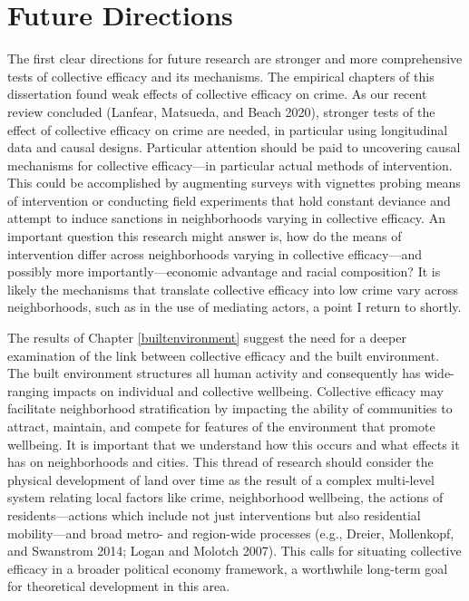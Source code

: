 \documentclass [11pt, proquest] {uwthesis}[2015/03/03]
\begin{document}
\hypertarget{future-directions}{%
\section{Future Directions}\label{future-directions}}

The first clear directions for future research are stronger and more comprehensive tests of collective efficacy and its mechanisms. The empirical chapters of this dissertation found weak effects of collective efficacy on crime. As our recent review concluded (Lanfear, Matsueda, and Beach 2020), stronger tests of the effect of collective efficacy on crime are needed, in particular using longitudinal data and causal designs. Particular attention should be paid to uncovering causal mechanisms for collective efficacy---in particular actual methods of intervention. This could be accomplished by augmenting surveys with vignettes probing means of intervention or conducting field experiments that hold constant deviance and attempt to induce sanctions in neighborhoods varying in collective efficacy. An important question this research might answer is, how do the means of intervention differ across neighborhoods varying in collective efficacy---and possibly more importantly---economic advantage and racial composition? It is likely the mechanisms that translate collective efficacy into low crime vary across neighborhoods, such as in the use of mediating actors, a point I return to shortly.

The results of Chapter \ref{builtenvironment} suggest the need for a deeper examination of the link between collective efficacy and the built environment. The built environment structures all human activity and consequently has wide-ranging impacts on individual and collective wellbeing. Collective efficacy may facilitate neighborhood stratification by impacting the ability of communities to attract, maintain, and compete for features of the environment that promote wellbeing. It is important that we understand how this occurs and what effects it has on neighborhoods and cities. This thread of research should consider the physical development of land over time as the result of a complex multi-level system relating local factors like crime, neighborhood wellbeing, the actions of residents---actions which include not just interventions but also residential mobility---and broad metro- and region-wide processes (e.g., Dreier, Mollenkopf, and Swanstrom 2014; Logan and Molotch 2007). This calls for situating collective efficacy in a broader political economy framework, a worthwhile long-term goal for theoretical development in this area.
\end{document}
